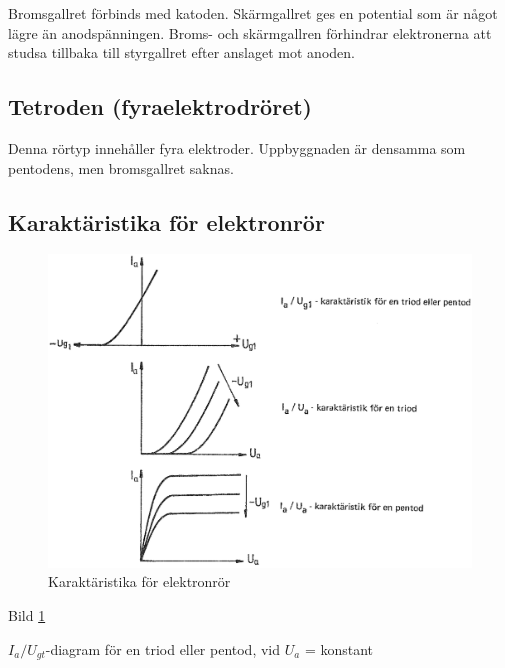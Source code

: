 Bromsgallret förbinds med katoden. Skärmgallret ges en potential som är något
lägre än anodspänningen. Broms- och skärmgallren förhindrar elektronerna att
studsa tillbaka till styrgallret efter anslaget mot anoden.


\subsection{Tetroden (fyraelektrodröret)}

Denna rörtyp innehåller fyra elektroder. Uppbyggnaden är densamma som pentodens,
men bromsgallret saknas.

\subsection{Karaktäristika för elektronrör}

\begin{figure}
\includegraphics[width=\textwidth]{images/cropped_pdfs/bild_2_2-32.pdf}
\caption{Karaktäristika för elektronrör}
\label{fig:BildII2-32}
\end{figure}

Bild \ref{fig:BildII2-32}

\(I_a/U_{gt}\)-diagram för en triod eller pentod, vid \(U_a\) = konstant

